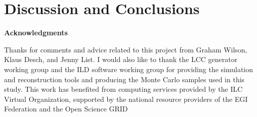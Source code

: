\documentclass[12pt]{article}
\def\Acknowledgments{\bigskip  \bigskip \begin{center} \begin{large}
             \bf Acknowledgments \end{large}\end{center}}
\begin{document}






\section{Discussion and Conclusions}
\label{conclude}



%




\Acknowledgments
Thanks for comments and advice related to this project from Graham Wilson, Klaus Desch, and Jenny List. I would also like to thank the LCC generator working group and the ILD software working group for providing the simulation and reconstruction tools and producing the Monte Carlo samples used in this study.
This work has benefited from computing services provided by the ILC Virtual Organization, supported by the national resource providers of the EGI Federation and the Open Science GRID

%



\end{document}
